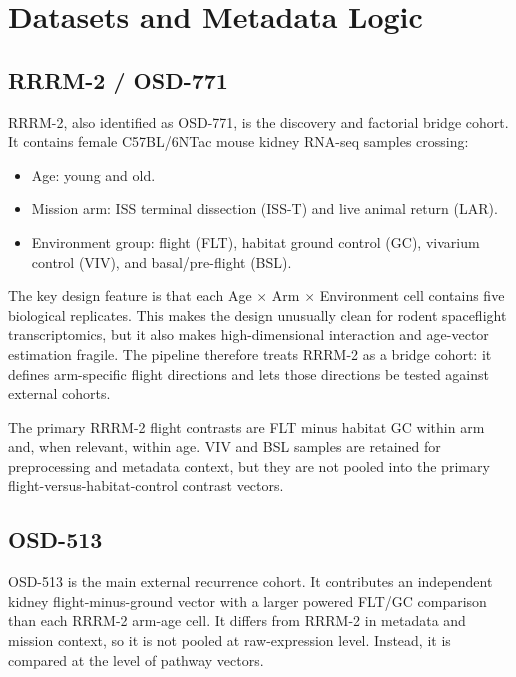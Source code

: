 \documentclass[11pt]{article}
\begin{document}
\section{Datasets and Metadata Logic}

\subsection{RRRM-2 / OSD-771}

RRRM-2, also identified as OSD-771, is the discovery and factorial bridge cohort. It contains female C57BL/6NTac mouse kidney RNA-seq samples crossing:

\begin{itemize}
  \item Age: young and old.
  \item Mission arm: ISS terminal dissection (ISS-T) and live animal return (LAR).
  \item Environment group: flight (FLT), habitat ground control (GC), vivarium control (VIV), and basal/pre-flight (BSL).
\end{itemize}

The key design feature is that each Age $\times$ Arm $\times$ Environment cell contains five biological replicates. This makes the design unusually clean for rodent spaceflight transcriptomics, but it also makes high-dimensional interaction and age-vector estimation fragile. The pipeline therefore treats RRRM-2 as a bridge cohort: it defines arm-specific flight directions and lets those directions be tested against external cohorts.

The primary RRRM-2 flight contrasts are FLT minus habitat GC within arm and, when relevant, within age. VIV and BSL samples are retained for preprocessing and metadata context, but they are not pooled into the primary flight-versus-habitat-control contrast vectors.

\subsection{OSD-513}

OSD-513 is the main external recurrence cohort. It contributes an independent kidney flight-minus-ground vector with a larger powered FLT/GC comparison than each RRRM-2 arm-age cell. It differs from RRRM-2 in metadata and mission context, so it is not pooled at raw-expression level. Instead, it is compared at the level of pathway vectors.
\end{document}
